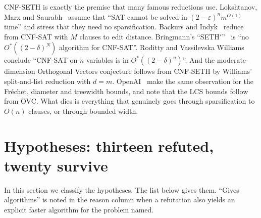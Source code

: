 \documentclass[10pt]{amsart}
\theoremstyle{plain}
\theoremstyle{definition}
\theoremstyle{remark}
\numberwithin{equation}{section}
\begin{document}
\noindent CNF-SETH is exactly the premise that many famous reductions use. Lokshtanov, Marx and
Saurabh~\cite{LMS11tw} assume that ``SAT cannot be solved in $(2-\varepsilon)^n m^{O(1)}$ time''
and stress that they need no sparsification. Backurs and Indyk~\cite{BI18} reduce from CNF-SAT
with $M$ clauses to edit distance. Bringmann's ``SETH$'$''~\cite{Bri14} is ``no $O^*((2-\delta)^N)$
algorithm for CNF-SAT''. Roditty and Vassilevska Williams~\cite[Theorem~1]{RVW13} conclude
``CNF-SAT on $n$ variables is in $O^*((2-\delta)^n)$''. And the moderate-dimension Orthogonal
Vectors conjecture follows from CNF-SETH by Williams' split-and-list reduction with $d=m$. OpenAI~\cite[\S1.1.3]{OpenAI26} make the same observation for the Fr\'echet, diameter and
treewidth bounds, and note that the LCS bounds follow from OVC. What dies is everything that
genuinely goes through sparsification to $O(n)$ clauses, or through bounded width.

\section{Hypotheses: thirteen refuted, twenty survive}\label{sec:tableA}

In this section we classify the hypotheses. The list below gives them. ``Gives algorithms'' is noted
in the reason column when a refutation also yields an explicit faster algorithm for the problem
named.
\end{document}
